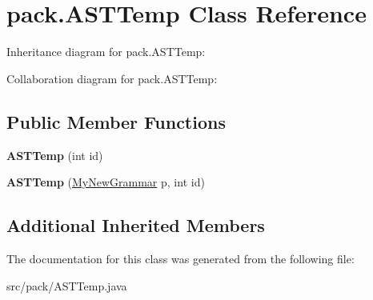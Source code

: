 \hypertarget{classpack_1_1_a_s_t_temp}{}\section{pack.\+A\+S\+T\+Temp Class Reference}
\label{classpack_1_1_a_s_t_temp}


Inheritance diagram for pack.\+A\+S\+T\+Temp\+:


Collaboration diagram for pack.\+A\+S\+T\+Temp\+:
\subsection*{Public Member Functions}
\begin{DoxyCompactItemize}
\item 
{\bfseries A\+S\+T\+Temp} (int id)\hypertarget{classpack_1_1_a_s_t_temp_ab8a8a434794a44e1f579e83c15b03138}{}\label{classpack_1_1_a_s_t_temp_ab8a8a434794a44e1f579e83c15b03138}

\item 
{\bfseries A\+S\+T\+Temp} (\hyperlink{classpack_1_1_my_new_grammar}{My\+New\+Grammar} p, int id)\hypertarget{classpack_1_1_a_s_t_temp_a4447e233be44e9b3fc25348c99b42fc1}{}\label{classpack_1_1_a_s_t_temp_a4447e233be44e9b3fc25348c99b42fc1}

\end{DoxyCompactItemize}
\subsection*{Additional Inherited Members}


The documentation for this class was generated from the following file\+:\begin{DoxyCompactItemize}
\item 
src/pack/A\+S\+T\+Temp.\+java\end{DoxyCompactItemize}
